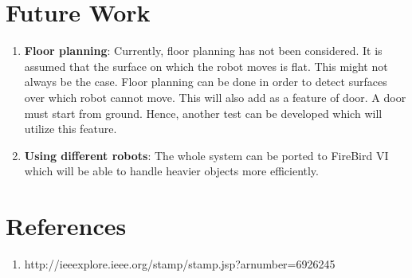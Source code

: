 \documentclass{report}
\begin{document}
\chapter{Future Work}

\begin{enumerate}
 \item \textbf{Floor planning}: Currently, floor planning has not been considered. It is assumed that the surface on which the
 robot moves is flat. This might not always be the case. Floor planning can be done in order to detect surfaces over which robot
 cannot move. This will also add as a feature of door. A door must start from ground. Hence, another test can be developed
 which will utilize this feature.
 
 \item \textbf{Using different robots}: The whole system can be ported to FireBird VI which will be able to handle heavier objects more efficiently.
\end{enumerate}

\chapter{References}
\begin{enumerate}
 \item http://ieeexplore.ieee.org/stamp/stamp.jsp?arnumber=6926245
\end{enumerate}
\end{document}
